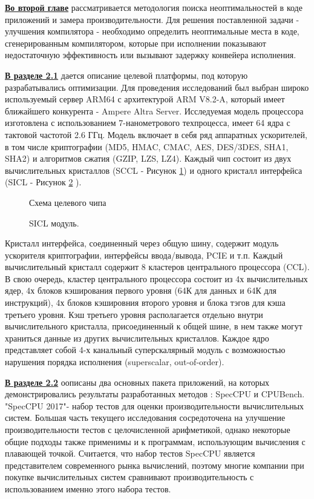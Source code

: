 \underline{\textbf{Во второй главе}} рассматривается методология поиска неоптимальностей в коде приложений и замера производительности. Для решения поставленной задачи - улучшения
компилятора - необходимо определить неоптимальные места в коде, сгенерированным компилятором, которые при исполнении показывают недостаточную эффективность или вызывают задержку конвейера исполнения.

\underline{\textbf{В разделе 2.1}}
дается описание целевой платформы, под которую разрабатывались
оптимизации. Для проведения исследований был выбран широко используемый сервер
ARM64 с архитектурой ARM V8.2-A, который имеет ближайшего конкурента - Ampere Altra Server. Исследуемая модель процессора изготовлена
с использованием 7-нанометрового техпроцесса, имеет 64 ядра с тактовой частотой
2.6 ГГц. Модель включает в себя ряд аппаратных ускорителей, в том
числе криптографии (MD5, HMAC, CMAC, AES, DES/3DES, SHA1, SHA2) и
алгоритмов сжатия (GZIP, LZS, LZ4).
Каждый чип состоит из двух вычислительных кристаллов (SCCL - Рисунок
\ref{chip1}) и одного кристалл интерфейса (SICL - Рисунок \ref{chip2} ).

\begin{figure}[htbp]
	\centering
	
	\caption{Схема целевого чипа}
	\label{chip1}
\end{figure}
\begin{figure}[htbp]
	\centering
	
	\caption{SICL модуль.}
	\label{chip2}
\end{figure}



Кристалл
интерфейса, соединенный через общую шину, содержит модуль ускорителя
криптографии, интерфейсы ввода/вывода, PCIE и т.п. Каждый вычислительный
кристалл содержит 8 кластеров центрального процессора (CCL). В свою
очередь, кластер центрального процессора состоит из 4х вычислительных ядер,
4х блоков кэширования первого уровня (64К для данных и 64К для инструкций),
4х блоков кэшировния второго уровня и блока тэгов для кэша третьего
уровня. Кэш третьего уровня располагается отдельно внутри вычислительного
кристалла, присоединенный к общей шине, в нем также могут храниться данные
из других вычислительных кристаллов. Каждое ядро представляет собой
4-х канальный суперскалярный модуль с возможностью нарушения порядка
исполнения (superscalar, out-of-order).



\underline{\textbf{В разделе 2.2}} оописаны два основных пакета приложений, на которых демонстрировались результаты разработанных методов : SpecCPU и CPUBench. "SpecCPU 2017"\phantom{ }- набор тестов для оценки производительности вычислительных
систем. Большая часть текущего исследования сосредоточена
на улучшение производительности тестов с целочисленной арифметикой,
однако некоторые общие подходы также применимы и к программам, использующим
вычисления с плавающей точкой. Считается, что набор тестов
SpecCPU является представителем современного рынка вычислений, поэтому
многие компании при покупке вычислительных систем сравнивают производительность
с использованием именно этого набора тестов. 

